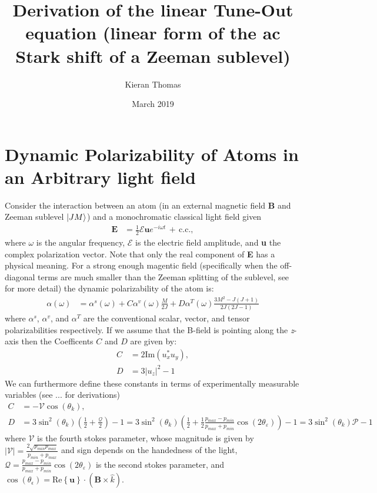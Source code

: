 \documentclass{article}
\title{Derivation of the linear Tune-Out equation (linear form of the ac
Stark shift of a Zeeman sublevel)}
\author{Kieran Thomas}
\date{March 2019}
\begin{document}
\maketitle
\section*{Dynamic Polarizability of Atoms in an Arbitrary light field}
Consider the interaction between an atom (in an external magnetic field \textbf{B} and Zeeman sublevel \(\ket{JM}\)) and a monochromatic classical light field given 
\begin{align}
    \textbf{E} &= \frac{1}{2} \mathcal{E} \textbf{u} e^{-i \omega t} \, + \, \text{c.c.},
\end{align}
where \(\omega\) is the angular frequency, \(\mathcal{E}\) is the electric field amplitude, and \textbf{u} the complex polarization vector. Note that only the real component of \textbf{E} has a physical meaning. For a strong enough magentic field (specifically when the off-diagonal terms are much smaller than the   Zeeman splitting of the sublevel, see \cite{} for more detail) the dynamic polarizability of the atom is:
\begin{align}
    \alpha(\omega) &= \alpha^s(\omega) + C \alpha^v(\omega) \frac{M}{2J} + D \alpha^T(\omega) \frac{3M^2-J(J+1)}{2J(2J-1)}
\end{align}
where \(\alpha^s\), \(\alpha^v\), and \(\alpha^T\) are the conventional scalar, vector, and tensor polarizabilities respectively. If we assume that the B-field is pointing along the \textit{z}-axis then the Coefficents \(C\) and \(D\) are given by:
\begin{align}
    C &= 2 \text{Im}(u_x^* u_y),\\
    D &= 3|u_z|^2 -1
\end{align}
We can furthermore define these constants in terms of experimentally measurable variables (see ... for derivations)
\begin{align}
     C &= - \mathcal{V} \cos \left( \theta_k \right), \label{eqn:C} \\
     D &= 3 \sin^2\left( \theta_k \right) \left(\frac{1}{2} +  \frac{\mathcal{Q}}{2}\right) -1 = 3 \sin^2\left( \theta_k \right) \left( \frac{1}{2} + \frac{1}{2} \frac{p_{max}-p_{min}}{p_{max}+p_{min}} \cos(2\theta_\varepsilon)\right) - 1 = 3 \sin^2(\theta_k) \mathcal{P}-1 \label{eqn:D}
\end{align}
where \(\mathcal{V}\) is the fourth stokes parameter, whose magnitude is given by \(|\mathcal{V}| = \frac{2\sqrt{p_{min}p_{max}}}{p_{min}+p_{max}}\) and sign depends on the handedness of the light, \(\mathcal{Q}=\frac{p_{max}-p_{min}}{p_{max}+p_{min}} \cos(2\theta_\varepsilon)\) is the second stokes parameter, and $\cos(\theta_\epsilon)=\text{Re}\left\{\textbf{u}\right\}\cdot(\textbf{B}\times \hat{k})$.
\end{document}
